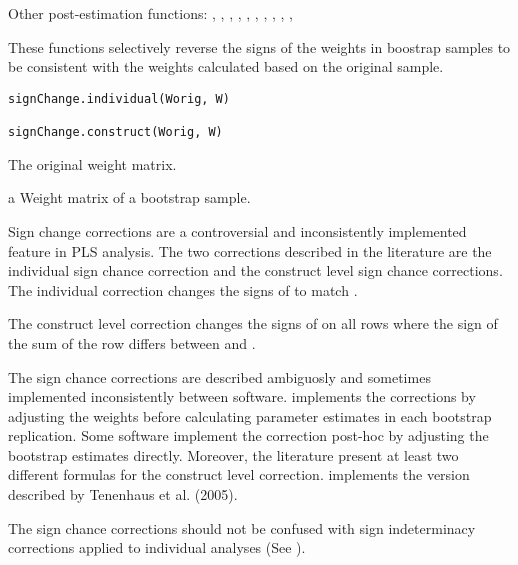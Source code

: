 \documentclass[a4paper]{book}
\begin{document}
%
\begin{SeeAlso}\relax
Other post-estimation functions: 
,
,
,
,
,
,
,
,
,
,
\end{SeeAlso}
%
\begin{Description}\relax
These functions selectively reverse the signs of the weights in boostrap samples to be consistent 
with the weights calculated based on the original sample.
\end{Description}
%
\begin{Usage}
\begin{verbatim}
signChange.individual(Worig, W)

signChange.construct(Worig, W)
\end{verbatim}
\end{Usage}
%
\begin{Arguments}
\begin{ldescription}
\item[\code{Worig}] The original weight matrix.

\item[\code{W}] a Weight matrix of a bootstrap sample.
\end{ldescription}
\end{Arguments}
%
\begin{Details}\relax
Sign change corrections are a controversial and inconsistently implemented feature in PLS analysis.
The two corrections described in the literature are the individual sign chance correction and the
construct level sign chance corrections.
The individual correction changes the signs of  to match .

The construct level correction changes the signs of  on all rows where the sign of the
sum of the row differs between  and .

The sign chance corrections are described ambiguosly and sometimes implemented inconsistently
between software.  implements the corrections by adjusting the weights before
calculating parameter estimates in each bootstrap replication. Some software implement the
correction post-hoc by adjusting the bootstrap estimates directly. Moreover, the 
literature present at least two different formulas for the construct level correction. 
 implements the version described by Tenenhaus et al. (2005).

The sign chance
corrections should not be confused with sign indeterminacy corrections applied to 
individual analyses
(See ).
\end{Details}
\end{document}
